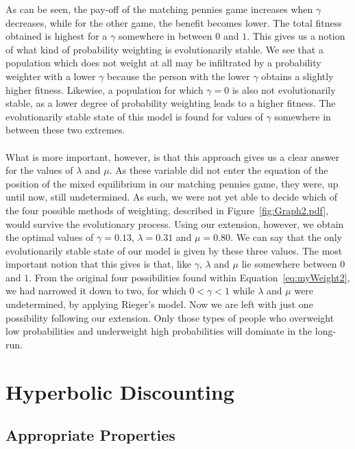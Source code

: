 \documentclass[a4paper,10pt]{article}
\numberwithin{equation}{section}
\begin{document}
As can be seen, the pay-off of the matching pennies game increases when $\gamma$ decreases, while for the other game, the benefit becomes lower. The total fitness obtained is highest for a $\gamma$ somewhere in between $0$ and $1$. This gives us a notion of what kind of probability weighting is evolutionarily stable. We see that a population which does not weight at all may be infiltrated by a probability weighter with a lower $\gamma$ because the person with the lower $\gamma$ obtains a slightly higher fitness. Likewise, a population for which $\gamma=0$ is also not evolutionarily stable, as a lower degree of probability weighting leads to a higher fitness. The evolutionarily stable state of this model is found for values of $\gamma$ somewhere in between these two extremes.\\
\\
What is more important, however, is that this approach gives us a clear answer for the values of $\lambda$ and $\mu$. As these variable did not enter the equation of the position of the mixed equilibrium in our matching pennies game, they were, up until now, still undetermined. As such, we were not yet able to decide which of the four possible methods of weighting, described in Figure~\ref{fig:Graph2.pdf}, would survive the evolutionary process. Using our extension, however, we obtain the optimal values of $\gamma=0.13$, $\lambda=0.31$ and $\mu=0.80$. We can say that the only evolutionarily stable state of our model is given by these three values. The most important notion that this gives is that, like $\gamma$, $\lambda$ and $\mu$ lie somewhere between $0$ and $1$. From the original four possibilities found within Equation~\ref{eq:myWeight2}, we had narrowed it down to two, for which $0<\gamma<1$ while $\lambda$ and $\mu$ were undetermined, by applying Rieger's model. Now we are left with just one possibility following our extension. Only those types of people who overweight low probabilities and underweight high probabilities will dominate in the long-run.


\section{Hyperbolic Discounting}
\label{sec:Hyperbolic Discounting}
\subsection{Appropriate Properties}
\label{sec:Appropriate Properties}
\end{document}
